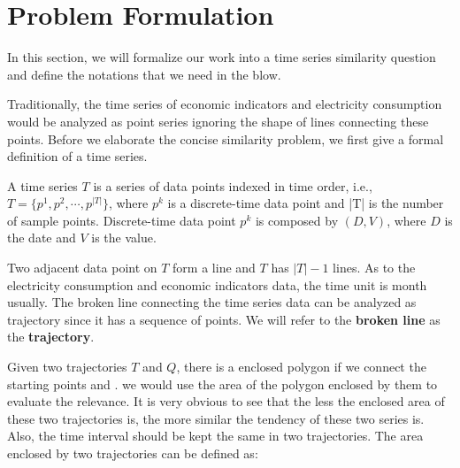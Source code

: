 

\section{Problem Formulation} \label{sec:prem}
In this section, we will formalize our work into a time series similarity question and define the notations that we need in the blow.

Traditionally, the time series of economic indicators and electricity consumption would be analyzed as point series ignoring the shape of lines connecting these points. Before we elaborate the concise similarity problem, we first give a formal definition of a time series. 

\newcommand{\loci}[1]{\ensuremath{p^{#1}}}
\begin{definition}
A time series $T$ is a series of data points indexed in time order, i.e., $T=\{\loci{1}, \loci{2}, \cdots, \loci{|T|}\}$, where $\loci{k}$ is a discrete-time data point and |T| is the number of sample points. Discrete-time data point $\loci{k}$ is composed by $\left(D,V\right)$, where $D$ is the date and $V$ is the value.
\end{definition}

Two adjacent data point on $T$ form a line and $T$ has $|T|-1$ lines. As to the electricity consumption and economic indicators data, the time unit is month usually. The broken line connecting the time series data can be analyzed as trajectory since it has a sequence of points. We will refer to the \textbf{broken line} as the \textbf{trajectory}.

Given two trajectories $T$ and $Q$, there is a enclosed polygon if we connect the starting points and . we would use the area of the polygon enclosed by them to evaluate the relevance. It is very obvious to see that the less the enclosed area of these two trajectories is, the more similar the tendency of these two series is. Also, the time interval should be kept the same in two trajectories. The area enclosed by two trajectories can be defined as:

